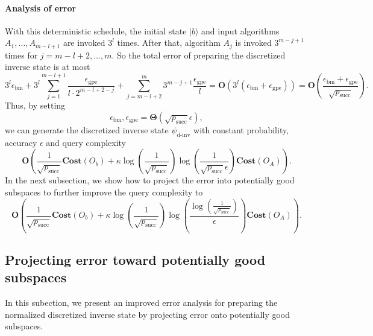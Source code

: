 \documentclass[letterpaper,onecolumn,11pt,accepted=2026-02-14]{quantumarticle}
\theoremstyle{remark}
\theoremstyle{plain}
\newcommand{\ket}[1]{|#1\rangle}
\begin{document}
\paragraph{Analysis of error}
With this deterministic schedule, the initial state $\ket{b}$ and input algorithms $A_1,\ldots,A_{m-l+1}$ are invoked $3^l$ times. After that, algorithm $A_{j}$ is invoked $3^{m-j+1}$ times for $j=m-l+2,\ldots,m$. So the total error of preparing the discretized inverse state is at most
\begin{equation}
    3^l\epsilon_{\text{bm}}
    +3^l\sum_{j=1}^{m-l+1}\frac{\epsilon_{\text{gpe}}}{l\cdot2^{m-l+2-j}}
    +\sum_{j=m-l+2}^m 3^{m-j+1}\frac{\epsilon_{\text{gpe}}}{l}
    =\mathbf{O}\left(3^l\left(\epsilon_{\text{bm}}+\epsilon_{\text{gpe}}\right)\right)
    =\mathbf{O}\left(\frac{\epsilon_{\text{bm}}+\epsilon_{\text{gpe}}}{\sqrt{p_{\text{succ}}}}\right).
\end{equation}
Thus, by setting
\begin{equation}
    \epsilon_{\text{bm}},\epsilon_{\text{gpe}}=\mathbf{\Theta}\left(\sqrt{p_{\text{succ}}}\epsilon\right),
\end{equation}
we can generate the discretized inverse state $\psi_{\text{d-inv}}$ with constant probability, accuracy $\epsilon$ and query complexity
\begin{equation}
    \mathbf{O}\left(\frac{1}{\sqrt{p_{\text{succ}}}}\mathbf{Cost}\left(O_b\right)
    +\kappa
    \log\left(\frac{1}{\sqrt{p_{\text{succ}}}}\right)
    \log\left(\frac{1}{\sqrt{p_{\text{succ}}}\epsilon}\right)
    \mathbf{Cost}\left(O_A\right)\right).
\end{equation}
In the next subsection, we show how to project the error into potentially good subspaces to further improve the query complexity to
\begin{equation}
    \mathbf{O}\left(\frac{1}{\sqrt{p_{\text{succ}}}}\mathbf{Cost}\left(O_b\right)
    +\kappa
    \log\left(\frac{1}{\sqrt{p_{\text{succ}}}}\right)
    \log\left(\frac{\log\left(\frac{1}{\sqrt{p_{\text{succ}}}}\right)}{\epsilon}\right)
    \mathbf{Cost}\left(O_A\right)\right).
\end{equation}

\subsection{Projecting error toward potentially good subspaces}
\label{sec:dinv_err}
In this subection, we present an improved error analysis for preparing the normalized discretized inverse state by projecting error onto potentially good subspaces.
\end{document}

